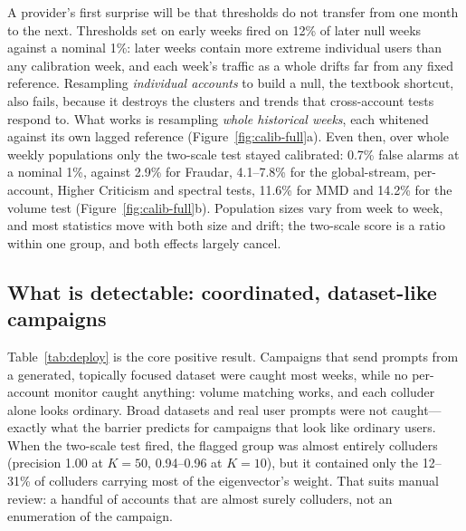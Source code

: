 A provider's first surprise will be that thresholds do not transfer from one month to the next. Thresholds set on early weeks fired on 12\% of later null weeks against a nominal 1\%: later weeks contain more extreme individual users than any calibration week, and each week's traffic as a whole drifts far from any fixed reference. Resampling \emph{individual accounts} to build a null, the textbook shortcut, also fails, because it destroys the clusters and trends that cross-account tests respond to. What works is resampling \emph{whole historical weeks}, each whitened against its own lagged reference (Figure~\ref{fig:calib-full}a). Even then, over whole weekly populations only the two-scale test stayed calibrated: 0.7\% false alarms at a nominal 1\%, against 2.9\% for Fraudar, 4.1--7.8\% for the global-stream, per-account, Higher Criticism and spectral tests, 11.6\% for MMD and 14.2\% for the volume test (Figure~\ref{fig:calib-full}b). Population sizes vary from week to week, and most statistics move with both size and drift; the two-scale score is a ratio within one group, and both effects largely cancel.


\subsection{What is detectable: coordinated, dataset-like campaigns}
\label{sec:deploy-full}



Table~\ref{tab:deploy} is the core positive result. Campaigns that send prompts from a generated, topically focused dataset were caught most weeks, while no per-account monitor caught anything: volume matching works, and each colluder alone looks ordinary. Broad datasets and real user prompts were not caught---exactly what the barrier predicts for campaigns that look like ordinary users. When the two-scale test fired, the flagged group was almost entirely colluders (precision 1.00 at $K=50$, 0.94--0.96 at $K=10$), but it contained only the 12--31\% of colluders carrying most of the eigenvector's weight. That suits manual review: a handful of accounts that are almost surely colluders, not an enumeration of the campaign.

